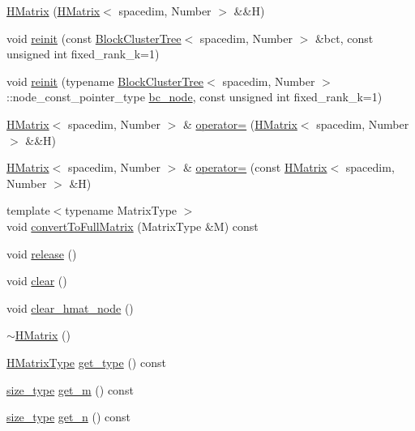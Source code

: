\begin{DoxyCompactItemize}
\item 
\hyperlink{classHMatrix_a556325d4cdaee699f17aa1be63bb58ee}{H\+Matrix} (\hyperlink{classHMatrix}{H\+Matrix}$<$ spacedim, Number $>$ \&\&H)
\item 
void \hyperlink{classHMatrix_a83f804163e1695cfb952ddb6b0df2503}{reinit} (const \hyperlink{classBlockClusterTree}{Block\+Cluster\+Tree}$<$ spacedim, Number $>$ \&bct, const unsigned int fixed\+\_\+rank\+\_\+k=1)
\item 
void \hyperlink{classHMatrix_a41d20c1839f3d7a756107b8e4defea0b}{reinit} (typename \hyperlink{classBlockClusterTree}{Block\+Cluster\+Tree}$<$ spacedim, Number $>$\+::node\+\_\+const\+\_\+pointer\+\_\+type \hyperlink{classHMatrix_a4a304494c970b5b267be1d8459d51586}{bc\+\_\+node}, const unsigned int fixed\+\_\+rank\+\_\+k=1)
\item 
\hyperlink{classHMatrix}{H\+Matrix}$<$ spacedim, Number $>$ \& \hyperlink{classHMatrix_a2c72ede65323af5b57a6b16f5774de50}{operator=} (\hyperlink{classHMatrix}{H\+Matrix}$<$ spacedim, Number $>$ \&\&H)
\item 
\hyperlink{classHMatrix}{H\+Matrix}$<$ spacedim, Number $>$ \& \hyperlink{classHMatrix_a83958971f40409b3b2a192b71eae1513}{operator=} (const \hyperlink{classHMatrix}{H\+Matrix}$<$ spacedim, Number $>$ \&H)
\item 
{\footnotesize template$<$typename Matrix\+Type $>$ }\\void \hyperlink{classHMatrix_a00bdd40f7fcf5c912c34c427df518300}{convert\+To\+Full\+Matrix} (Matrix\+Type \&M) const
\item 
void \hyperlink{classHMatrix_a812e8276888b2ad866edf7ce9b286839}{release} ()
\item 
void \hyperlink{classHMatrix_ae55bd45587b895bfdb977e7cbea46519}{clear} ()
\item 
void \hyperlink{classHMatrix_aec0815bc9c3654391bb2b3095383e6cb}{clear\+\_\+hmat\+\_\+node} ()
\item 
\hyperlink{classHMatrix_ae16c956c1b22eb307e9f360a83f4fa75}{$\sim$\+H\+Matrix} ()
\item 
\hyperlink{hmatrix_8h_ac04719e202c88f36e4533fe1d326a494}{H\+Matrix\+Type} \hyperlink{classHMatrix_aadea9fa59f420d22b3b1c939f6b573cc}{get\+\_\+type} () const
\item 
\hyperlink{classHMatrix_a5ca8dc549783d38371a01ecd621ecb34}{size\+\_\+type} \hyperlink{classHMatrix_aabe735f7712a10ba5325ff116f8ca1c7}{get\+\_\+m} () const
\item 
\hyperlink{classHMatrix_a5ca8dc549783d38371a01ecd621ecb34}{size\+\_\+type} \hyperlink{classHMatrix_abff89130116d62ea4159bc69ca11f8d5}{get\+\_\+n} () const

\end{DoxyCompactItemize}
